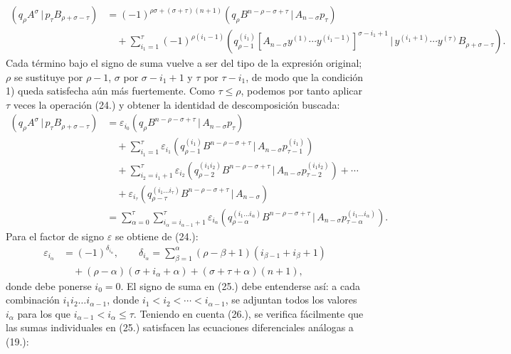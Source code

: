 \documentclass[11pt]{article}
\newcommand{\pair}[2]{(#1\,|\,#2)}
\newcommand{\eps}{\varepsilon}
\begin{document}
\begin{equation}
\begin{aligned}
\pair{q_\rho A^\sigma}{p_\tau B_{\rho+\sigma-\tau}}
&=(-1)^{\rho\sigma+(\sigma+\tau)(n+1)}
  \pair{q_\rho B^{n-\rho-\sigma+\tau}}{A_{n-\sigma}p_\tau}\\
&\quad+\sum_{i_1=1}^{\tau}(-1)^{\rho(i_1-1)}
 \pair{q_{\rho-1}^{(i_1)}[A_{n-\sigma}y^{(1)}\cdots y^{(i_1-1)}]^{\sigma-i_1+1}}
 {y^{(i_1+1)}\cdots y^{(\tau)}B_{\rho+\sigma-\tau}}.
\end{aligned}
\tag{24}
\end{equation}
Cada término bajo el signo de suma vuelve a ser del tipo de la expresión original; $\rho$ se sustituye por $\rho-1$, $\sigma$ por $\sigma-i_1+1$ y $\tau$ por $\tau-i_1$, de modo que la condición 1) queda satisfecha aún más fuertemente. Como $\tau\le\rho$, podemos por tanto aplicar $\tau$ veces la operación (24.) y obtener la identidad de descomposición buscada:
\begin{equation}
\begin{aligned}
\pair{q_\rho A^\sigma}{p_\tau B_{\rho+\sigma-\tau}}
&=\eps_{i_0}\pair{q_\rho B^{n-\rho-\sigma+\tau}}{A_{n-\sigma}p_\tau}\\
&\quad+\sum_{i_1=1}^{\tau}\eps_{i_1}
 \pair{q_{\rho-1}^{(i_1)}B^{n-\rho-\sigma+\tau}}{A_{n-\sigma}p_{\tau-1}^{(i_1)}}\\
&\quad+\sum_{i_2=i_1+1}^{\tau}\eps_{i_2}
 \pair{q_{\rho-2}^{(i_1i_2)}B^{n-\rho-\sigma+\tau}}{A_{n-\sigma}p_{\tau-2}^{(i_1i_2)}}+\cdots\\
&\quad+\eps_{i_\tau}\pair{q_{\rho-\tau}^{(i_1\ldots i_\tau)}B^{n-\rho-\sigma+\tau}}{A_{n-\sigma}}\\
&=\sum_{\alpha=0}^{\tau}\sum_{i_\alpha=i_{\alpha-1}+1}^{\tau}\eps_{i_\alpha}
 \pair{q_{\rho-\alpha}^{(i_1\ldots i_\alpha)}B^{n-\rho-\sigma+\tau}}{A_{n-\sigma}p_{\tau-\alpha}^{(i_1\ldots i_\alpha)}}.
\end{aligned}
\tag{25}
\end{equation}
Para el factor de signo $\eps$ se obtiene de (24.):
\begin{equation}
\begin{aligned}
\eps_{i_\alpha}&=(-1)^{\delta_{i_\alpha}},\qquad
\delta_{i_\alpha}=\sum_{\beta=1}^{\alpha}(\rho-\beta+1)(i_{\beta-1}+i_\beta+1)\\
&\quad +(\rho-\alpha)(\sigma+i_\alpha+\alpha)+(\sigma+\tau+\alpha)(n+1),
\end{aligned}
\tag{26}
\end{equation}
donde debe ponerse $i_0=0$. El signo de suma en (25.) debe entenderse así: a cada combinación $i_1i_2\ldots i_{\alpha-1}$, donde $i_1<i_2<\cdots<i_{\alpha-1}$, se adjuntan todos los valores $i_\alpha$ para los que $i_{\alpha-1}<i_\alpha\le\tau$. Teniendo en cuenta (26.), se verifica fácilmente que las sumas individuales en (25.) satisfacen las ecuaciones diferenciales análogas a (19.):
\end{document}
